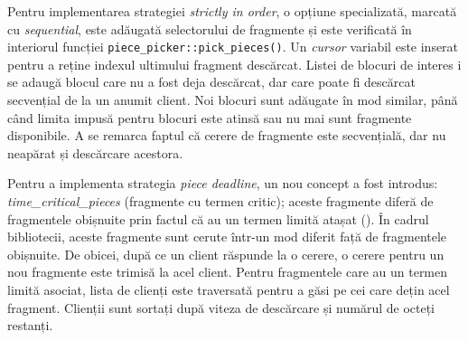 Pentru implementarea strategiei \textit{strictly in order}, o opțiune
specializată, marcată cu \textit{sequential}, este adăugată selectorului de
fragmente și este verificată în interiorul funcției
\texttt{piece\_picker::pick\_pieces()}. Un \textit{cursor} variabil este
inserat pentru a reține indexul ultimului fragment descărcat. Listei de
blocuri de interes i se adaugă blocul care nu a fost deja descărcat, dar care
poate fi descărcat secvențial de la un anumit client. Noi blocuri sunt
adăugate în mod similar, până când limita impusă pentru blocuri este atinsă
sau nu mai sunt fragmente disponibile. A se remarca faptul că cerere de
fragmente este secvențială, dar nu neapărat și descărcare acestora.

Pentru a implementa strategia \textit{piece deadline}, un nou concept a fost
introdus: \textit{time\_critical\_pieces} (fragmente cu termen critic); aceste
fragmente diferă de fragmentele obișnuite prin factul că au un termen limită
atașat (). În cadrul bibliotecii, aceste fragmente sunt
cerute într-un mod diferit față de fragmentele obișnuite. De obicei, după ce
un client răspunde la o cerere, o cerere pentru un nou fragmente este trimisă
la acel client. Pentru fragmentele care au un termen limită asociat, lista de
clienți este traversată pentru a găsi pe cei care dețin acel fragment.
Clienții sunt sortați după viteza de descărcare și numărul de octeți restanți.

